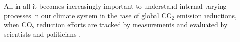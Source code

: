 All in all it becomes increasingly important to understand internal varying processes in our climate system in the case of global CO$_2$ emission reductions, when CO$_2$ reduction efforts are tracked by measurements and evaluated by scientists and politicians \citep{Hawkins2009,McKinley2016,Lovenduski2016,Marotzke2017}.\newline

